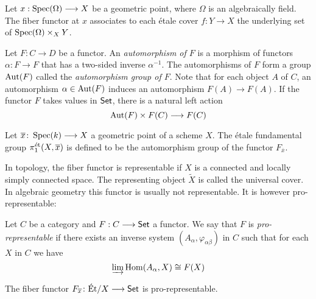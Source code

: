 \begin{definition}
	Let $x: \operatorname{Spec}(\Omega) \longrightarrow X$ be a geometric point, where $\Omega$ is an algebraically field. The fiber functor at $x$ associates to each \'etale cover $f: Y \to X$ the underlying set of $\operatorname{Spec}(\Omega) \times_X Y$.
\end{definition}

\begin{definition}
	Let $F: C \to D$ be a functor. An \textit{automorphism of $F$} is a morphism of functors $\alpha \colon F \to F$ that has a two-sided inverse $\alpha^{-1}$. The automorphisms of $F$ form a group $\operatorname{Aut}(F)$ called the \textit{automorphism group of $F$}. Note that for each object $A$ of $C$, an automorphism $\alpha \in \operatorname{Aut}(F)$ induces an automorphism $F(A) \to F(A)$. If the functor $F$ takes values in $\mathsf{Set}$, there is a natural left action
	\[
		\operatorname{Aut}(F) \times F(C) \longrightarrow F(C)
	\]
\end{definition}

\begin{definition}
	Let $\overline{x} \colon \operatorname{Spec}(k) \longrightarrow X$ a geometric point of a scheme $X$. The \'etale fundamental group $\pi^{\text{\'et}}_1(X,\overline{x})$ is defined to be the automorphism group of the functor $F_{\overline{x}}$.
\end{definition}

\begin{remark}
	In topology, the fiber functor is representable if $X$ is a connected and locally simply connected space. The representing object $\tilde{X}$ is called the universal cover. In algebraic geometry this functor is usually not representable. It is however pro-representable:
\end{remark}

\begin{definition}
	Let $C$ be a category and $F: C \longrightarrow \mathsf{Set}$ a functor. We say that $F$ is \textit{pro-representable} if there exists an inverse system $(A_\alpha,\varphi_{\alpha \beta})$ in $C$ such that for each $X$ in $C$ we have
	\[
		\varinjlim \operatorname{Hom}(A_\alpha, X) \cong F(X)
	\]
\end{definition}

\begin{theorem}\label{theorem:pro_representability}
	The fiber functor $F_{\overline{x}} \colon \text{\'Et}/X \longrightarrow \mathsf{Set}$ is pro-representable.
\end{theorem}

